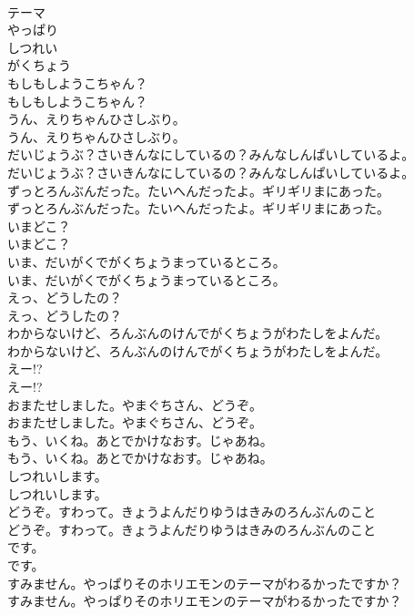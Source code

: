 \documentclass[8pt]{extreport}
\begin{document}
\begin{CJK}{UTF8}{min}
\\	テーマ
\\	やっぱり
\\	しつれい
\\	がくちょう
\\	もしもしようこちゃん？	
\\	もしもしようこちゃん？ 
\\	うん、えりちゃんひさしぶり。	
\\	うん、えりちゃんひさしぶり。 
\\	だいじょうぶ？さいきんなにしているの？みんなしんぱいしているよ。	
\\	だいじょうぶ？さいきんなにしているの？みんなしんぱいしているよ。 
\\	ずっとろんぶんだった。たいへんだったよ。ギリギリまにあった。	
\\	ずっとろんぶんだった。たいへんだったよ。ギリギリまにあった。 
\\	いまどこ？	
\\	いまどこ？ 
\\	いま、だいがくでがくちょうまっているところ。	
\\	いま、だいがくでがくちょうまっているところ。 
\\	えっ、どうしたの？	
\\	えっ、どうしたの？ 
\\	わからないけど、ろんぶんのけんでがくちょうがわたしをよんだ。	
\\	わからないけど、ろんぶんのけんでがくちょうがわたしをよんだ。 
\\	えー!?	
\\	えー!? 
\\	おまたせしました。やまぐちさん、どうぞ。	
\\	おまたせしました。やまぐちさん、どうぞ。 
\\	もう、いくね。あとでかけなおす。じゃあね。	
\\	もう、いくね。あとでかけなおす。じゃあね。 
\\	しつれいします。	
\\	しつれいします。 
\\	どうぞ。すわって。きょうよんだりゆうはきみのろんぶんのこと	
\\	どうぞ。すわって。きょうよんだりゆうはきみのろんぶんのこと 
\\	です。	
\\	です。 
\\	すみません。やっぱりそのホリエモンのテーマがわるかったですか？	
\\	すみません。やっぱりそのホリエモンのテーマがわるかったですか？ 

\end{CJK}
\end{document}
